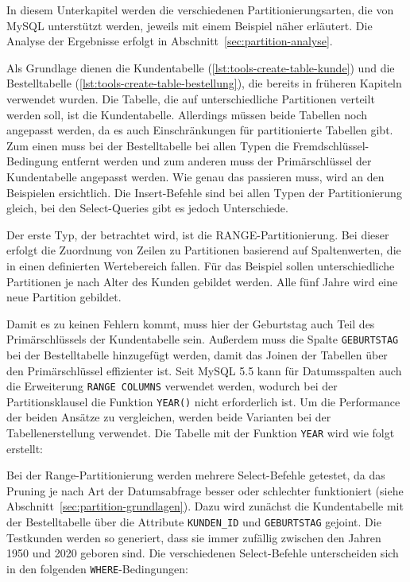 In diesem Unterkapitel werden die verschiedenen Partitionierungsarten, die von MySQL unterstützt werden, jeweils mit einem Beispiel näher erläutert.
Die Analyse der Ergebnisse erfolgt in Abschnitt~\ref{sec:partition-analyse}.

Als Grundlage dienen die Kundentabelle (\ref{lst:tools-create-table-kunde}) und die Bestelltabelle (\ref{lst:tools-create-table-bestellung}), die bereits in früheren Kapiteln verwendet wurden.
Die Tabelle, die auf unterschiedliche Partitionen verteilt werden soll, ist die Kundentabelle.
Allerdings müssen beide Tabellen noch angepasst werden, da es auch Einschränkungen für partitionierte Tabellen gibt.
Zum einen muss bei der Bestelltabelle bei allen Typen die Fremdschlüssel-Bedingung entfernt werden und zum anderen muss der Primärschlüssel der Kundentabelle angepasst werden.
Wie genau das passieren muss, wird an den Beispielen ersichtlich.
Die Insert-Befehle sind bei allen Typen der Partitionierung gleich, bei den Select-Queries gibt es jedoch Unterschiede.

Der erste Typ, der betrachtet wird, ist die RANGE-Partitionierung.
Bei dieser erfolgt die Zuordnung von Zeilen zu Partitionen basierend auf Spaltenwerten, die in einen definierten Wertebereich fallen.
Für das Beispiel sollen unterschiedliche Partitionen je nach Alter des Kunden gebildet werden.
Alle fünf Jahre wird eine neue Partition gebildet.

Damit es zu keinen Fehlern kommt, muss hier der Geburtstag auch Teil des Primärschlüssels der Kundentabelle sein.
Außerdem muss die Spalte \texttt{GEBURTSTAG} bei der Bestelltabelle hinzugefügt werden, damit das Joinen der Tabellen über den Primärschlüssel effizienter ist.
Seit MySQL 5.5 kann für Datumsspalten auch die Erweiterung \texttt{RANGE COLUMNS} verwendet werden, wodurch bei der Partitionsklausel die Funktion \texttt{YEAR()} nicht erforderlich ist.
Um die Performance der beiden Ansätze zu vergleichen, werden beide Varianten bei der Tabellenerstellung verwendet.
Die Tabelle mit der Funktion \texttt{YEAR{}} wird wie folgt erstellt:


\vspace{-5pt}

Bei der Range-Partitionierung werden mehrere Select-Befehle getestet, da das Pruning je nach Art der Datumsabfrage besser oder schlechter funktioniert (siehe Abschnitt~\ref{sec:partition-grundlagen}).
Dazu wird zunächst die Kundentabelle mit der Bestelltabelle über die Attribute \texttt{KUNDEN\_ID} und \texttt{GEBURTSTAG} gejoint.
Die Testkunden werden so generiert, dass sie immer zufällig zwischen den Jahren 1950 und 2020 geboren sind.
Die verschiedenen Select-Befehle unterscheiden sich in den folgenden \texttt{WHERE}-Bedingungen:

